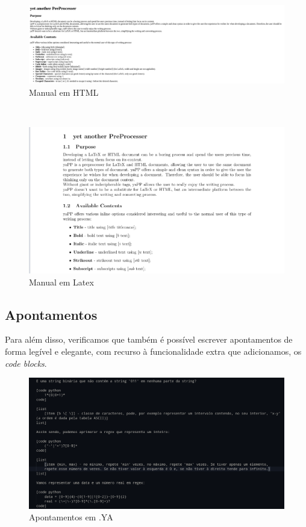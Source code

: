 \documentclass{article}
\begin{document}
\begin{figure}[!ht]
\centering
\includegraphics[width=\textwidth]{images/manualHTML.png}
\caption{Manual em HTML}
\end{figure}
\\
 
\begin{figure}[!ht]
\centering
\includegraphics[width=\textwidth]{images/manualTEX.png}
\caption{Manual em Latex}
\end{figure}
 \subsection{Apontamentos}
Para além disso, verificamos que também é possível escrever apontamentos de forma legível e elegante, com recurso à funcionalidade extra que adicionamos, os \textit{code blocks}.\\
 
\begin{figure}[!ht]
\centering
\includegraphics[width=\textwidth]{images/apontamentosYA.png}
\caption{Apontamentos em .YA}
\end{figure}
\\
 
\end{document}
